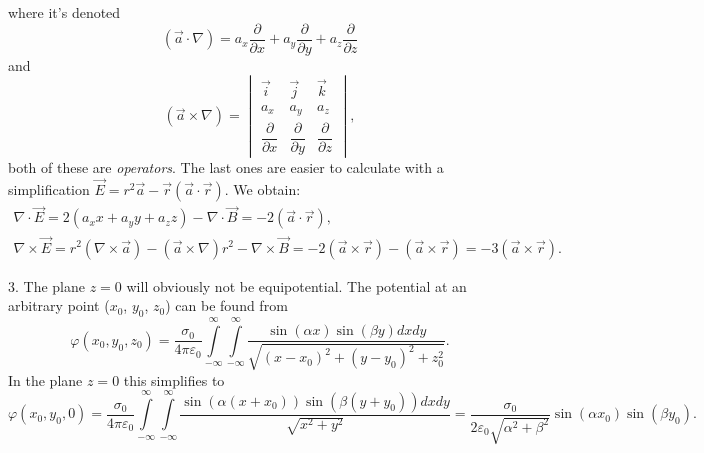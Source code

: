 \documentclass[14pt]{article}
\begin{document}
where it's denoted
$$
  \left(\vec{a}\cdot\nabla\right)=a_x \frac{\partial}{\partial x}+a_y \frac{\partial}{\partial y}+a_z \frac{\partial}{\partial z}
$$
and
$$
  \left(\vec{a}\times\nabla\right)=\begin{vmatrix}
  \vec{i} & \vec{j} & \vec{k}\\
  a_x & a_y & a_z\\
  \dfrac{\partial}{\partial x} & \dfrac{\partial}{\partial y} & \dfrac{\partial}{\partial z}
  \end{vmatrix},
$$
both of these are \textit{operators}. The last ones are easier to calculate with a simplification $\vec{E}=r^2 \vec{a}-\vec{r}\left(\vec{a}\cdot\vec{r}\right)$. We obtain:
\begin{gather}
  \nabla\cdot\vec{E}=2(a_x x+a_y y+a_z z)-\nabla\cdot\vec{B}=-2\left(\vec{a}\cdot\vec{r}\right),\nonumber\\
  \nabla\times\vec{E}=r^2\left(\nabla\times\vec{a}\right)-\left(\vec{a}\times\nabla\right)r^2-\nabla\times\vec{B}=-2\left(\vec{a}\times\vec{r}\right) -\left(\vec{a}\times\vec{r}\right)=-3\left(\vec{a}\times\vec{r}\right).\nonumber
\end{gather}

3. The plane $z=0$ will obviously not be equipotential. The potential at an arbitrary point ($x_0$, $y_0$, $z_0$) can be found from
$$
  \varphi(x_0,y_0,z_0)=\frac{\sigma_0}{4\pi\varepsilon_0}\int\limits_{-\infty}^\infty \int\limits_{-\infty}^\infty \frac{\sin(\alpha x)\sin(\beta y)dxdy}{\sqrt{(x-x_0)^2+(y-y_0)^2+z_0^2}}.
$$
In the plane $z=0$ this simplifies to
$$
  \varphi(x_0,y_0,0)=\frac{\sigma_0}{4\pi\varepsilon_0}\int\limits_{-\infty}^\infty \int\limits_{-\infty}^\infty \frac{\sin(\alpha (x+x_0))\sin(\beta (y+y_0))dxdy}{\sqrt{x^2+y^2}}=\frac{\sigma_0}{2\varepsilon_0 \sqrt{\alpha^2+\beta^2}}\sin(\alpha x_0)\sin(\beta y_0).
$$
\end{document}
